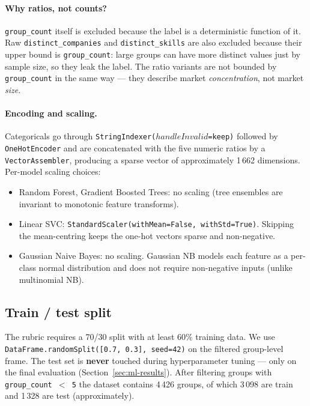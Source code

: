 \documentclass[11pt,a4paper]{article}
\begin{document}
\paragraph{Why ratios, not counts?}
\texttt{group\_count} itself is excluded because the label is a
deterministic function of it.  Raw \texttt{distinct\_companies} and
\texttt{distinct\_skills} are also excluded because their upper bound
is \texttt{group\_count}: large groups can have more distinct values
just by sample size, so they leak the label.  The ratio variants are
not bounded by \texttt{group\_count} in the same way --- they
describe market \emph{concentration}, not market \emph{size}.

\paragraph{Encoding and scaling.}
Categoricals go through \texttt{StringIndexer($handleInvalid$=keep)}
followed by \texttt{OneHotEncoder} and are concatenated with the five
numeric ratios by a \texttt{VectorAssembler}, producing a sparse
vector of approximately 1\,662 dimensions.  Per-model scaling
choices:

\begin{itemize}[leftmargin=*]
  \item Random Forest, Gradient Boosted Trees: no scaling (tree
    ensembles are invariant to monotonic feature transforms).
  \item Linear SVC: \texttt{StandardScaler(withMean=False,
    withStd=True)}.  Skipping the mean-centring keeps the one-hot
    vectors sparse and non-negative.
  \item Gaussian Naive Bayes: no scaling.  Gaussian NB models each
    feature as a per-class normal distribution and does not require
    non-negative inputs (unlike multinomial NB).
\end{itemize}

\subsection{Train / test split}
The rubric requires a 70/30 split with at least 60\% training data.
We use \texttt{DataFrame.randomSplit([0.7, 0.3], seed=42)} on the
filtered group-level frame.  The test set is \textbf{never} touched
during hyperparameter tuning --- only on the final evaluation
(Section~\ref{sec:ml-results}).  After filtering groups with
\texttt{group\_count $<$ 5} the dataset contains 4\,426 groups, of
which 3\,098 are train and 1\,328 are test (approximately).
\end{document}
